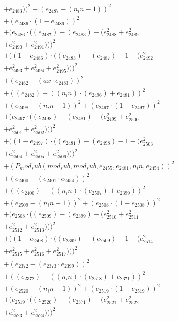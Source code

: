\documentclass[10pt, a4paper]{article}
\begin{document}
\begin{small}
\begin{align*}
& + e_{2483}))^{2} + (e_{2487} - (n_in - 1))^{2} \\
& + (e_{2486}  \cdot  (1 - e_{2486}))^{2} \\
& + (e_{2486}  \cdot  ((e_{2487}) - (e_{2483}) - (e_{2488}^{2} + e_{2489}^{2} \\
& + e_{2490}^{2} + e_{2491}^{2})))^{2} \\
& + ((1 - e_{2486})  \cdot  ((e_{2483}) - (e_{2487}) - 1 - (e_{2492}^{2} \\
& + e_{2493}^{2} + e_{2494}^{2} + e_{2495}^{2})))^{2} \\
& + (e_{2482} - (ax  \cdot  e_{2483}))^{2} \\
& + ((e_{2482}) - ((n_in)  \cdot  (e_{2496}) + e_{2481}))^{2} \\
& + (e_{2498} - (n_in - 1))^{2} + (e_{2497}  \cdot  (1 - e_{2497}))^{2} \\
& + (e_{2497}  \cdot  ((e_{2498}) - (e_{2481}) - (e_{2499}^{2} + e_{2500}^{2} \\
& + e_{2501}^{2} + e_{2502}^{2})))^{2} \\
& + ((1 - e_{2497})  \cdot  ((e_{2481}) - (e_{2498}) - 1 - (e_{2503}^{2} \\
& + e_{2504}^{2} + e_{2505}^{2} + e_{2506}^{2})))^{2} \\
& + (P_mod_sub(mod_sub, mod_sub, e_{2455}, e_{2481}, n_in, e_{2454}))^{2} \\
& + (e_{2400} - (e_{2401}  \cdot  e_{2454}))^{2} \\
& + ((e_{2400}) - ((n_in)  \cdot  (e_{2507}) + e_{2399}))^{2} \\
& + (e_{2509} - (n_in - 1))^{2} + (e_{2508}  \cdot  (1 - e_{2508}))^{2} \\
& + (e_{2508}  \cdot  ((e_{2509}) - (e_{2399}) - (e_{2510}^{2} + e_{2511}^{2} \\
& + e_{2512}^{2} + e_{2513}^{2})))^{2} \\
& + ((1 - e_{2508})  \cdot  ((e_{2399}) - (e_{2509}) - 1 - (e_{2514}^{2} \\
& + e_{2515}^{2} + e_{2516}^{2} + e_{2517}^{2})))^{2} \\
& + (e_{2372} - (e_{2373}  \cdot  e_{2399}))^{2} \\
& + ((e_{2372}) - ((n_in)  \cdot  (e_{2518}) + e_{2371}))^{2} \\
& + (e_{2520} - (n_in - 1))^{2} + (e_{2519}  \cdot  (1 - e_{2519}))^{2} \\
& + (e_{2519}  \cdot  ((e_{2520}) - (e_{2371}) - (e_{2521}^{2} + e_{2522}^{2} \\
& + e_{2523}^{2} + e_{2524}^{2})))^{2} \\

\end{align*}
\end{small}
\end{document}
